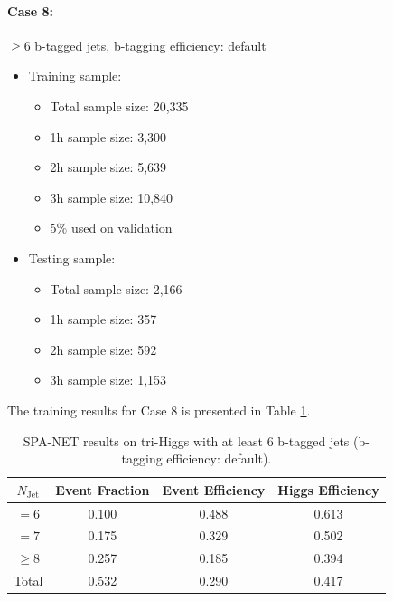 \documentclass[12pt]{article}
\begin{document}
		\paragraph{Case 8:} $\ge 6$ b-tagged jets, b-tagging efficiency: default
		\begin{itemize}
			\item Training sample:
			\begin{itemize}
				\item Total sample size: 20,335
				\item 1h sample size: 3,300
				\item 2h sample size: 5,639
				\item 3h sample size: 10,840
				\item 5\% used on validation
			\end{itemize}
			\item Testing sample: 
				\begin{itemize}
					\item Total sample size: 2,166
					\item 1h sample size: 357
					\item 2h sample size: 592
					\item 3h sample size: 1,153
				\end{itemize}
		\end{itemize}
		The training results for Case 8 is presented in Table \ref{tab:SPANet_triHiggs_6btag_default}.
		\begin{table}[htpb]
			\centering
			\caption{SPA-NET results on tri-Higgs with at least 6 b-tagged jets (b-tagging efficiency: default).}
			\label{tab:SPANet_triHiggs_6btag_default}
			\begin{tabular}{c|c|cc}
				$N_\text{Jet}$ & Event Fraction & Event Efficiency & Higgs Efficiency \\
				\hline
				$=6$	  &   0.100             &    0.488              &    0.613             \\
				$=7$	  &   0.175             &    0.329              &    0.502             \\
				$\ge 8$	  &   0.257             &    0.185              &    0.394             \\
				Total	  &   0.532             &    0.290              &    0.417             \\
			\end{tabular}
		\end{table}
\end{document}

